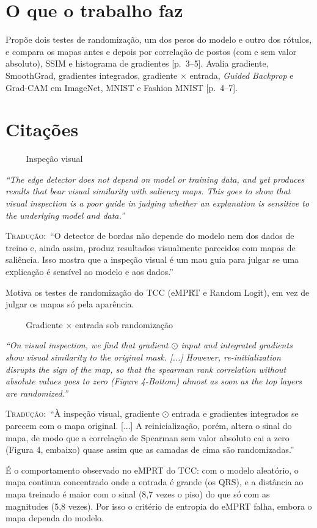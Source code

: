 \documentclass[11pt,a4paper]{article}
\newcommand{\pagechip}[1]{{\setlength{\fboxsep}{1.5pt}\colorbox{cAcc}{\textcolor{white}{\scriptsize\texttt{#1}}}}}
\newenvironment{origquote}{\par\itshape\small}{\par}
\newenvironment{tradquote}{\par\small\textsc{Tradução:}\ }{\par}
\newcommand{\explab}[1]{\par\smallskip{\small\color{cAcc}\textbf{\MakeUppercase{#1}}}\par}
\begin{document}
\section{O que o trabalho faz}
Propõe dois testes de randomização, um dos pesos do modelo e outro dos rótulos, e compara os mapas antes e depois por correlação de postos (com e sem valor absoluto), SSIM e histograma de gradientes [p.~3--5]. Avalia gradiente, SmoothGrad, gradientes integrados, gradiente $\times$ entrada, \textit{Guided Backprop} e Grad-CAM em ImageNet, MNIST e Fashion MNIST [p.~4--7].

\section{Citações}

\begin{citacard}{\pagechip{p. 2} Inspeção visual}
\begin{origquote}“The edge detector does not depend on model or training data, and yet produces results that bear visual similarity with saliency maps. This goes to show that visual inspection is a poor guide in judging whether an explanation is sensitive to the underlying model and data.”\end{origquote}
\begin{tradquote}“O detector de bordas não depende do modelo nem dos dados de treino e, ainda assim, produz resultados visualmente parecidos com mapas de saliência. Isso mostra que a inspeção visual é um mau guia para julgar se uma explicação é sensível ao modelo e aos dados.”\end{tradquote}
\explab{Explicação}
Motiva os testes de randomização do TCC (eMPRT e Random Logit), em vez de julgar os mapas só pela aparência.
\end{citacard}

\begin{citacard}{\pagechip{p. 5} Gradiente × entrada sob randomização}
\begin{origquote}“On visual inspection, we find that gradient $\odot$ input and integrated gradients show visual similarity to the original mask. [...] However, re-initialization disrupts the sign of the map, so that the spearman rank correlation without absolute values goes to zero (Figure 4-Bottom) almost as soon as the top layers are randomized.”\end{origquote}
\begin{tradquote}“À inspeção visual, gradiente $\odot$ entrada e gradientes integrados se parecem com o mapa original. [...] A reinicialização, porém, altera o sinal do mapa, de modo que a correlação de Spearman sem valor absoluto cai a zero (Figura 4, embaixo) quase assim que as camadas de cima são randomizadas.”\end{tradquote}
\explab{Explicação}
É o comportamento observado no eMPRT do TCC: com o modelo aleatório, o mapa continua concentrado onde a entrada é grande (os QRS), e a distância ao mapa treinado é maior com o sinal (8,7 vezes o piso) do que só com as magnitudes (5,8 vezes). Por isso o critério de entropia do eMPRT falha, embora o mapa dependa do modelo.
\end{citacard}
\end{document}
